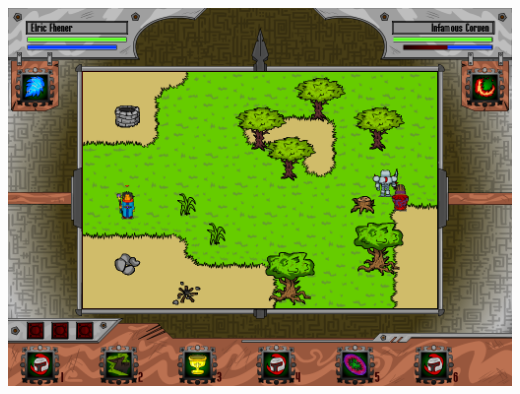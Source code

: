 \documentclass{beamer}
\begin{document}
\begin{frame}
\begin{columns}[c]
\begin{center}
	    \includegraphics[scale=0.15]{img/magicduel.png}
	\end{center}
	
	\end{columns}
		
\end{frame}
\end{document}
